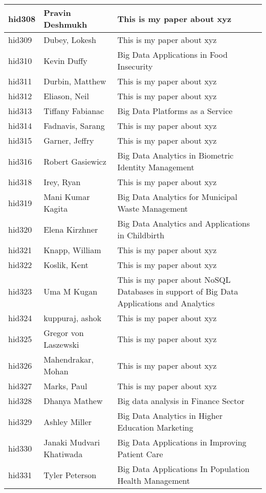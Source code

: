 \documentclass[12pt]{article}
\begin{document}
\begin{footnotesize}
\begin{longtable}{|p{1cm}p{5cm}p{9cm}|}
\hline
hid308 & Pravin Deshmukh & This is my paper about xyz  \\
\hline
hid309 & Dubey, Lokesh & This is my paper about xyz  \\
\hline
hid310 & Kevin Duffy & Big Data Applications in Food Insecurity  \\
\hline
hid311 & Durbin, Matthew & This is my paper about xyz  \\
\hline
hid312 & Eliason, Neil & This is my paper about xyz  \\
\hline
hid313 & Tiffany Fabianac & Big Data Platforms as a Service  \\
\hline
hid314 & Fadnavis, Sarang & This is my paper about xyz  \\
\hline
hid315 & Garner, Jeffry & This is my paper about xyz  \\
\hline
hid316 & Robert Gasiewicz & Big Data Analytics in Biometric Identity Management  \\
\hline
hid318 & Irey, Ryan & This is my paper about xyz  \\
\hline
hid319 & Mani Kumar Kagita & Big Data Analytics for Municipal Waste Management  \\
\hline
hid320 & Elena Kirzhner & Big Data Analytics and Applications in Childbirth  \\
\hline
hid321 & Knapp, William & This is my paper about xyz  \\
\hline
hid322 & Koslik, Kent & This is my paper about xyz  \\
\hline
hid323 & Uma M Kugan & This is my paper about NoSQL Databases in support of Big Data Applications and Analytics  \\
\hline
hid324 & kuppuraj, ashok & This is my paper about xyz  \\
\hline
hid325 & Gregor von Laszewski & This is my paper about xyz  \\
\hline
hid326 & Mahendrakar, Mohan & This is my paper about xyz  \\
\hline
hid327 & Marks, Paul & This is my paper about xyz  \\
\hline
hid328 & Dhanya Mathew & Big data analysis in Finance Sector  \\
\hline
hid329 & Ashley Miller & Big Data Analytics in Higher Education Marketing  \\
\hline
hid330 & Janaki Mudvari Khatiwada & Big Data Applications in Improving Patient Care  \\
\hline
hid331 & Tyler Peterson & Big Data Applications In Population Health Management  \\

\end{longtable}
\end{footnotesize}
\end{document}
